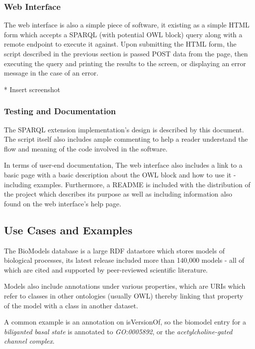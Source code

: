 \documentclass{article}
\begin{document}
\subsubsection{Web Interface}

The web interface is also a simple piece of software, it existing as a simple
HTML form which accepts a SPARQL (with potential OWL block) query along with a
remote endpoint to execute it against. Upon submitting the HTML form, the script
described in the previous section is passed POST data from the page, then
executing the query and printing the results to the screen, or displaying an
error message in the case of an error.

* Insert screenshot

\subsubsection{Testing and Documentation}

The SPARQL extension implementation's design is described by this document. The
script itself also includes ample commenting to help a reader understand the
flow and meaning of the code involved in the software.

In terms of user-end documentation, The web interface also includes a link to a 
basic page with a basic description
about the OWL block and how to use it - including examples. Furthermore, a
README is included with the distribution of the project which describes its
purpose as well as including information also found on the web interface's help
page.

\subsection{Use Cases and Examples}

The BioModels database is a large RDF datastore which stores models of
biological processes, its latest release included more than 140,000 models - all
of which are cited and supported by peer-reviewed scientific literature.

Models also include annotations under various properties, which are URIs which 
refer to classes in other ontologies (usually OWL) thereby linking that property
of the model with a class in another dataset. 

A common example is an annotation on isVersionOf, so the biomodel entry for a
\emph{biliganted basal state} is annotated to \emph{GO:0005892}, or the
\emph{acetylcholine-gated channel complex}.
\end{document}
